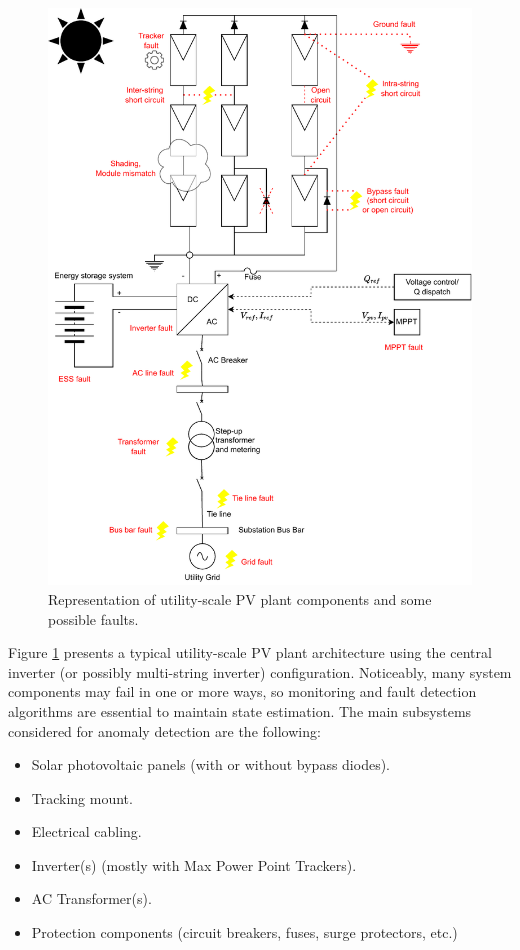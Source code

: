 \begin{figure}[h!]
    \centering
    \includegraphics[width=15cm]{figures/chapter2/pvplant.drawio.pdf}
    \caption{Representation of utility-scale PV plant components and some possible faults.}
    \label{fig:topologies}
\end{figure}

Figure \ref{fig:topologies} presents a typical utility-scale PV plant architecture using the central inverter (or possibly multi-string inverter) configuration. Noticeably, many system components may fail in one or more ways, so monitoring and fault detection algorithms are essential to maintain state estimation. The main subsystems considered for anomaly detection are the following:

\begin{itemize}
    \item Solar photovoltaic panels (with or without bypass diodes).
    \item Tracking mount.
    \item Electrical cabling.
    \item Inverter(s) (mostly with Max Power Point Trackers).
    \item AC Transformer(s).
    \item Protection components (circuit breakers, fuses, surge protectors,
    etc.)
\end{itemize}

